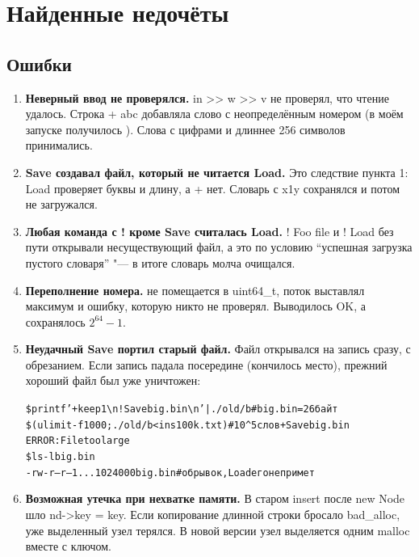 \section{Найденные недочёты}

\subsection{Ошибки}
\begin{enumerate}
\item {\bfseries Неверный ввод не проверялся.} {\ttfamily in >> w >> v} не проверял, что чтение
удалось. Строка {\ttfamily + abc} добавляла слово с неопределённым номером (в моём запуске
получилось {}). Слова с цифрами и длиннее 256 символов принимались.
\item {\bfseries Save создавал файл, который не читается Load.} Это следствие пункта 1:
{\ttfamily Load} проверяет буквы и длину, а {\ttfamily +} нет. Словарь с {\ttfamily x1y} сохранялся
и потом не загружался.
\item {\bfseries Любая команда с {\ttfamily !} кроме {\ttfamily Save} считалась {\ttfamily Load}.}
{\ttfamily ! Foo file} и {\ttfamily ! Load} без пути открывали несуществующий файл, а это по условию
\enquote{успешная загрузка пустого словаря} "--- в итоге словарь молча очищался.
\item {\bfseries Переполнение номера.} {} не помещается в
{\ttfamily uint64\_t}, поток выставлял максимум и ошибку, которую никто не проверял. Выводилось
{\ttfamily OK}, а сохранялось $2^{64}-1$.
\item {\bfseries Неудачный Save портил старый файл.} Файл открывался на запись сразу, с обрезанием.
Если запись падала посередине (кончилось место), прежний хороший файл был уже уничтожен:
\begin{alltt}
\$ printf '+ keep 1\textbackslash{}n! Save big.bin\textbackslash{}n' | ./old/b    # big.bin = 26 байт
\$ (ulimit -f 1000; ./old/b < ins100k.txt)            # 10^5 слов + Save big.bin
ERROR: File too large
\$ ls -l big.bin
-rw-r--r-- 1 ... 1024000 big.bin                      # обрывок, Load его не примет
\end{alltt}
\item {\bfseries Возможная утечка при нехватке памяти.} В старом {\ttfamily insert} после
{\ttfamily new Node} шло {\ttfamily nd->key = key}. Если копирование длинной строки бросало
{\ttfamily bad\_alloc}, уже выделенный узел терялся. В новой версии узел выделяется одним
{\ttfamily malloc} вместе с ключом.
\end{enumerate}

